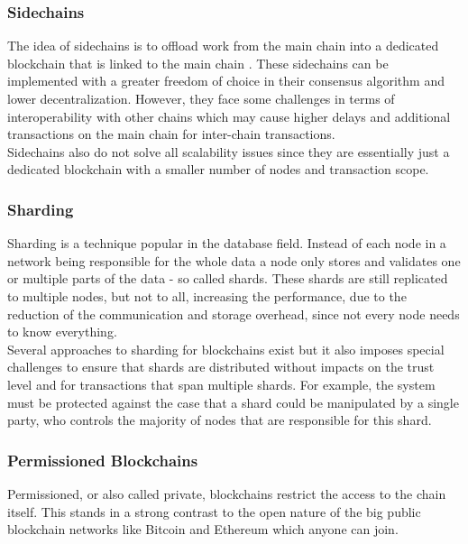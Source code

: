 \documentclass[a4paper,12pt]{scrartcl}
\begin{document}
\subsubsection{Sidechains}

The idea of sidechains is to offload work from the main chain into a dedicated blockchain that is linked to the main chain \cite{Back2014}\cite{Croman2017}. These sidechains can be implemented with a greater freedom of choice in their consensus algorithm and lower decentralization. However, they face some challenges in terms of interoperability with other chains which may cause higher delays and additional transactions on the main chain for inter-chain transactions.\\
Sidechains also do not solve all scalability issues since they are essentially just a dedicated blockchain with a smaller number of nodes and transaction scope.

\subsubsection{Sharding}

Sharding \cite{Croman2017} is a technique popular in the database field. Instead of each node in a network being responsible for the whole data a node only stores and validates one or multiple parts of the data - so called shards. These shards are still replicated to multiple nodes, but not to all, increasing the performance, due to the reduction of the communication and storage overhead, since not every node needs to know everything.\\
Several approaches to sharding for blockchains exist \cite{Li2017}\cite{Gencer2017}\cite{kokoris2017omniledger}\cite{luu2016secure} but it also imposes special challenges to ensure that shards are distributed without impacts on the trust level and for transactions that span multiple shards. For example, the system must be protected against the case that a shard could be manipulated by a single party, who controls the majority of nodes that are responsible for this shard.

\subsubsection{Permissioned Blockchains}

Permissioned, or also called private, blockchains restrict the access to the chain itself. This stands in a strong contrast to the open nature of the big public blockchain networks like Bitcoin and Ethereum which anyone can join.\\
\end{document}
